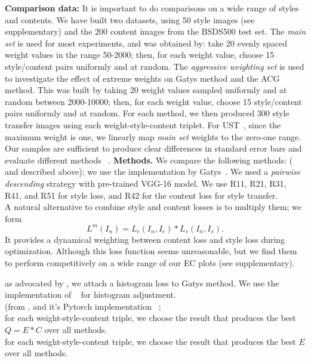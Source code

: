 \documentclass[runningheads]{llncs}
\begin{document}
{\bf Comparison data:}  It is important to do comparisons on a wide range of styles and contents.  
We have built two datasets, using 50 style images (see supplementary) and the 200 content images from the BSDS500  test set. The {\em main set} is used for most experiments, and was obtained by:  
take 20 evenly spaced weight values in the range 50-2000; 
then, for each weight value, choose 15 style/content pairs uniformly and at random.  
The {\em aggressive weighting set} is used to investigate the effect of extreme weights 
on Gatys method and the ACG method.  This was built by taking 20 weight values sampled uniformly and 
at random between 2000-10000; then, for each weight value, 
choose 15 style/content pairs uniformly and at random.   
For each method, we then produced 300 style transfer images using each weight-style-content triplet.  
For UST~\cite{UST}, since the maximum weight is one, 
we linearly map \textit{main set} weights to the zero-one range. 
Our samples are sufficient to produce 
clear differences in standard error bars and evaluate different methods ~\cite{Forsyth2018}. 
{\bf Methods.}  We compare the following methods:
 (\cite{gatys2016image} and described above); we use the implementation by Gatys~\cite{leongatys}.
 We used a {\em pairwise descending} strategy with pre-trained VGG-16 model. We use R11, R21, R31, R41, and R51 for style loss, and R42 for the content loss for style transfer.\\
  A natural alternative to combine style and content losses is to multiply them; we form 
\[
L^m(I_n) = L_c(I_n, I_c) *  L_s(I_n, I_s).
\]
It provides a dynamical weighting between content loss and style loss during optimization. Although this loss function seems unreasonable, but we find them to perform competitively on a wide range of our EC plots (see supplementary).

  as advocated by \cite{risser2017stable}, we attach a histogram loss to
Gatys method.  
  We use the implementation of ~\cite{abhiskk} for histogram adjustment.\\
(from \cite{UST}, and it's Pytorch implementation~\cite{SunshineAtNoon} %
;\\
  for each weight-style-content triple, we choose the result that produces the best  $Q=E*C$
over all methods.\\
 for each weight-style-content triple, we choose the result that produces the best  $E$
over all methods.
\end{document}
